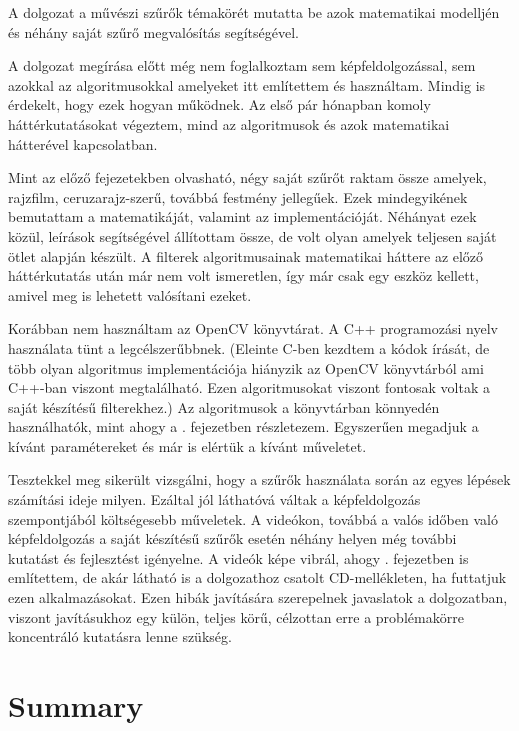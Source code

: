 

A dolgozat a művészi szűrők témakörét mutatta be azok matematikai modelljén és néhány saját szűrő megvalósítás segítségével.

A dolgozat megírása előtt még nem foglalkoztam sem képfeldolgozással, sem azokkal az algoritmusokkal amelyeket itt említettem és használtam. Mindig is érdekelt, hogy ezek hogyan működnek. Az első pár hónapban komoly háttérkutatásokat végeztem, mind az algoritmusok és azok matematikai hátterével kapcsolatban.

Mint az előző fejezetekben olvasható, négy saját szűrőt raktam össze amelyek, rajzfilm, ceruzarajz-szerű, továbbá festmény jellegűek. Ezek mindegyikének bemutattam a matematikáját, valamint az implementációját. Néhányat ezek közül, leírások segítségével állítottam össze, de volt olyan amelyek teljesen saját ötlet alapján készült. A filterek algoritmusainak matematikai háttere az előző háttérkutatás után már nem volt ismeretlen, így már csak egy eszköz kellett, amivel meg is lehetett valósítani ezeket. 

Korábban nem használtam az OpenCV könyvtárat. A C++ programozási nyelv használata tünt a legcélszerűbbnek. (Eleinte C-ben kezdtem a kódok írását, de több olyan algoritmus implementációja hiányzik az OpenCV könyvtárból ami C++-ban viszont megtalálható. Ezen algoritmusokat viszont fontosak voltak a saját készítésű filterekhez.) Az algoritmusok a könyvtárban könnyedén használhatók, mint ahogy a . fejezetben részletezem. Egyszerűen megadjuk a kívánt paramétereket és már is elértük a kívánt műveletet.

Tesztekkel meg sikerült vizsgálni, hogy a szűrők használata során az egyes lépések számítási ideje milyen. Ezáltal jól láthatóvá váltak a képfeldolgozás szempontjából költségesebb műveletek. A videókon, továbbá a valós időben való képfeldolgozás a saját készítésű szűrők esetén néhány helyen még további kutatást és fejlesztést igényelne. A videók képe vibrál, ahogy . fejezetben is említettem, de akár látható is a dolgozathoz csatolt CD-mellékleten, ha futtatjuk ezen alkalmazásokat. Ezen hibák javítására szerepelnek javaslatok a dolgozatban, viszont javításukhoz egy külön, teljes körű, célzottan erre a problémakörre koncentráló kutatásra lenne szükség.

\newpage

\section*{Summary}

